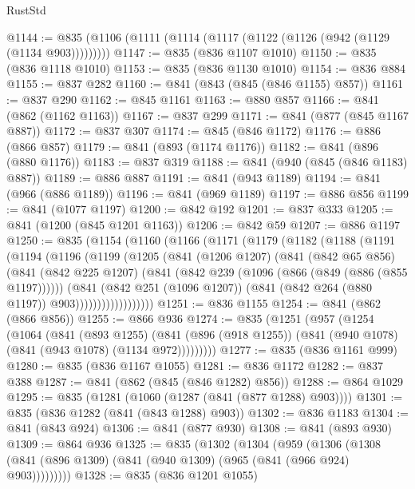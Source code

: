 \begin{lexlean}{RustStd}
\begin{coremodule}
@1144 := @835 (@1106 (@1111 (@1114 (@1117 (@1122 (@1126 (@942 (@1129 (@1134 @903)))))))))
@1147 := @835 (@836 @1107 @1010)
@1150 := @835 (@836 @1118 @1010)
@1153 := @835 (@836 @1130 @1010)
@1154 := @836 @884
@1155 := @837 @282
@1160 := @841 (@843 (@845 (@846 @1155) @857))
@1161 := @837 @290
@1162 := @845 @1161
@1163 := @880 @857
@1166 := @841 (@862 (@1162 @1163))
@1167 := @837 @299
@1171 := @841 (@877 (@845 @1167 @887))
@1172 := @837 @307
@1174 := @845 (@846 @1172)
@1176 := @886 (@866 @857)
@1179 := @841 (@893 (@1174 @1176))
@1182 := @841 (@896 (@880 @1176))
@1183 := @837 @319
@1188 := @841 (@940 (@845 (@846 @1183) @887))
@1189 := @886 @887
@1191 := @841 (@943 @1189)
@1194 := @841 (@966 (@886 @1189))
@1196 := @841 (@969 @1189)
@1197 := @886 @856
@1199 := @841 (@1077 @1197)
@1200 := @842 @192
@1201 := @837 @333
@1205 := @841 (@1200 (@845 @1201 @1163))
@1206 := @842 @59
@1207 := @886 @1197
@1250 := @835
    (@1154
      (@1160
        (@1166
          (@1171
            (@1179
              (@1182
                (@1188
                  (@1191
                    (@1194
                      (@1196
                        (@1199
                          (@1205
                            (@841
                              (@1206 @1207)
                              (@841
                                (@842 @65 @856)
                                (@841
                                  (@842 @225 @1207)
                                  (@841
                                    (@842 @239 (@1096 (@866 (@849 (@886 (@855 @1197))))))
                                    (@841
                                      (@842 @251 (@1096 @1207))
                                      (@841 (@842 @264 (@880 @1197)) @903))))))))))))))))))
@1251 := @836 @1155
@1254 := @841 (@862 (@866 @856))
@1255 := @866 @936
@1274 := @835
    (@1251
      (@957
        (@1254
          (@1064
            (@841
              (@893 @1255)
              (@841 (@896 (@918 @1255)) (@841 (@940 @1078) (@841 (@943 @1078) (@1134 @972)))))))))
@1277 := @835 (@836 @1161 @999)
@1280 := @835 (@836 @1167 @1055)
@1281 := @836 @1172
@1282 := @837 @388
@1287 := @841 (@862 (@845 (@846 @1282) @856))
@1288 := @864 @1029
@1295 := @835 (@1281 (@1060 (@1287 (@841 (@877 @1288) @903))))
@1301 := @835 (@836 @1282 (@841 (@843 @1288) @903))
@1302 := @836 @1183
@1304 := @841 (@843 @924)
@1306 := @841 (@877 @930)
@1308 := @841 (@893 @930)
@1309 := @864 @936
@1325 := @835
    (@1302
      (@1304
        (@959
          (@1306 (@1308 (@841 (@896 @1309) (@841 (@940 @1309) (@965 (@841 (@966 @924) @903)))))))))
@1328 := @835 (@836 @1201 @1055)

\end{coremodule}
\end{lexlean}
